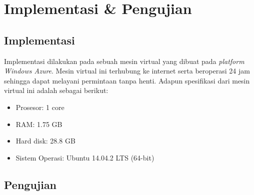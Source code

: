 \chapter{Implementasi & Pengujian}
\label{chap:implementasi_pengujian}

\section{Implementasi}

Implementasi dilakukan pada sebuah mesin virtual yang dibuat pada \textit{platform Windows Azure}. Mesin virtual ini terhubung ke internet serta beroperasi 24 jam sehingga dapat melayani permintaan tanpa henti. Adapun spesifikasi dari mesin virtual ini adalah sebagai berikut:

\begin{itemize}
	\item Prosesor: 1 core
	\item RAM: 1.75 GB
	\item Hard disk: 28.8 GB
	\item Sistem Operasi: Ubuntu 14.04.2 LTS (64-bit)
\end{itemize}

\section{Pengujian}
